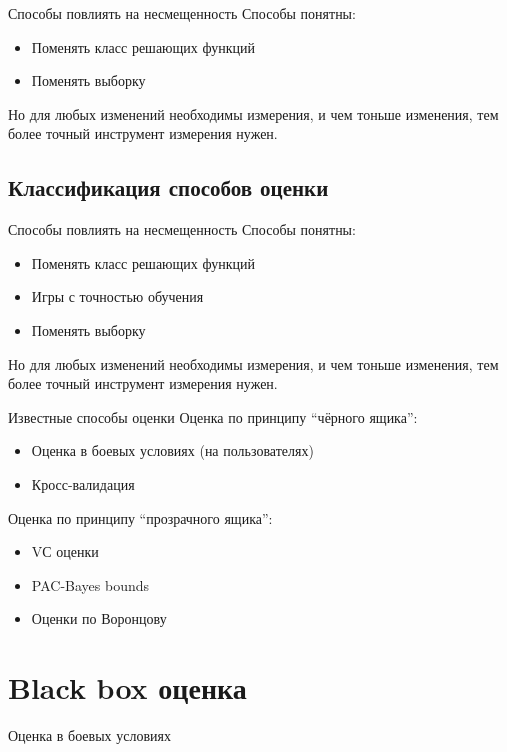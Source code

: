 \documentclass[14pt, fleqn, xcolor={dvipsnames, table}]{beamer}
\begin{document}
\begin{frame}{Способы повлиять на несмещенность}
Способы понятны:
\begin{itemize}
  \item Поменять класс решающих функций
  \item Поменять выборку
\end{itemize}
Но для любых изменений необходимы измерения, и чем тоньше изменения, тем более точный инструмент измерения нужен.
\end{frame}

\subsection{Классификация способов оценки}
\begin{frame}{Способы повлиять на несмещенность}
Способы понятны:
\begin{itemize}
  \item Поменять класс решающих функций
  \item Игры с точностью обучения
  \item Поменять выборку
\end{itemize}
Но для любых изменений необходимы измерения, и чем тоньше изменения, тем более точный инструмент измерения нужен.
\end{frame}

\begin{frame}{Известные способы оценки}
Оценка по принципу ``чёрного ящика'':
\begin{itemize}
  \item Оценка в боевых условиях (на пользователях)
  \item Кросс-валидация
\end{itemize}
Оценка по принципу ``прозрачного ящика'':
\begin{itemize}
  \item VС оценки
  \item PAC-Bayes bounds
  \item Оценки по Воронцову
\end{itemize}
\end{frame}

\section{Black box оценка}
\begin{frame}{Оценка в боевых условиях}

\end{frame}
\end{document}
